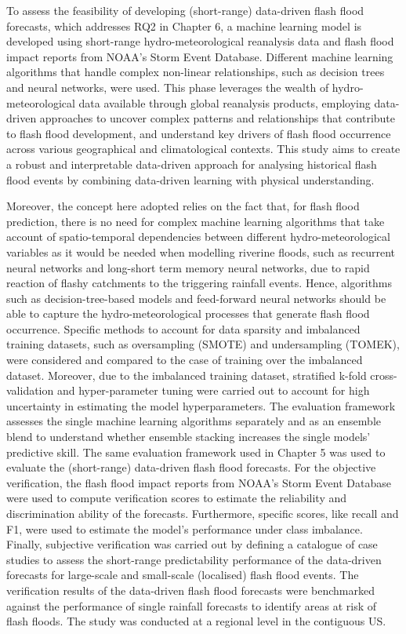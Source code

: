 To assess the feasibility of developing (short-range) data-driven flash flood forecasts, which addresses RQ2 in Chapter 6, a machine learning model is developed using short-range hydro-meteorological reanalysis data and flash flood impact reports from NOAA's Storm Event Database. Different machine learning algorithms that handle complex non-linear relationships, such as decision trees and neural networks, were used. This phase leverages the wealth of hydro-meteorological data available through global reanalysis products, employing data-driven approaches to uncover complex patterns and relationships that contribute to flash flood development, and understand key drivers of flash flood occurrence across various geographical and climatological contexts. This study aims to create a robust and interpretable data-driven approach for analysing historical flash flood events by combining data-driven learning with physical understanding. 

Moreover, the concept here adopted relies on the fact that, for flash flood prediction, there is no need for complex machine learning algorithms that take account of spatio-temporal dependencies between different hydro-meteorological variables as it would be needed when modelling riverine floods, such as recurrent neural networks and long-short term memory neural networks, due to rapid reaction of flashy catchments to the triggering rainfall events. Hence, algorithms such as decision-tree-based models and feed-forward neural networks should be able to capture the hydro-meteorological processes that generate flash flood occurrence. Specific methods to account for data sparsity and imbalanced training datasets, such as oversampling (SMOTE) and undersampling (TOMEK), were considered and compared to the case of training over the imbalanced dataset. Moreover, due to the imbalanced training dataset, stratified k-fold cross-validation and hyper-parameter tuning were carried out to account for high uncertainty in estimating the model hyperparameters. The evaluation framework assesses the single machine learning algorithms separately and as an ensemble blend to understand whether ensemble stacking increases the single models' predictive skill. The same evaluation framework used in Chapter 5 was used to evaluate the (short-range) data-driven flash flood forecasts. For the objective verification, the flash flood impact reports from NOAA's Storm Event Database were used to compute verification scores to estimate the reliability and discrimination ability of the forecasts. Furthermore, specific scores, like recall and F1, were used to estimate the model's performance under class imbalance. Finally, subjective verification was carried out by defining a catalogue of case studies to assess the short-range predictability performance of the data-driven forecasts for large-scale and small-scale (localised) flash flood events. The verification results of the data-driven flash flood forecasts were benchmarked against the performance of single rainfall forecasts to identify areas at risk of flash floods. The study was conducted at a regional level in the contiguous US.  

